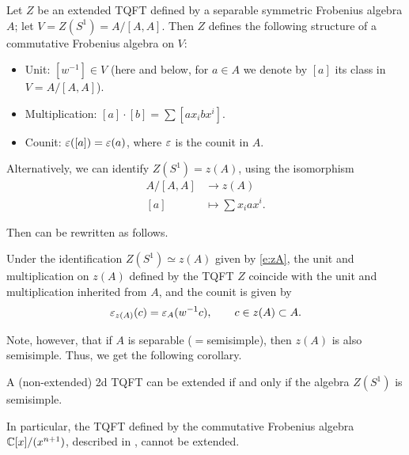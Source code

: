 \begin{theorem}\label{t:centerTQFT}
  Let $Z$ be an extended TQFT defined by a separable symmetric Frobenius algebra
  $A$; let $V=Z(S^1)=A/[A,A]$. Then $Z$ defines the following structure of
  a commutative Frobenius algebra on $V$:
  \begin{itemize}
    \item Unit: $[w^{-1}]\in V$ \textup{(}here and below, for $a\in A$ we denote by
        $[a]$ its class in $V=A/[A,A]$\textup{)}.
    \item Multiplication: $[a]\cdot [b]=\sum [ax_ibx^i]$.
    \item Counit: $\varepsilon([a])=\varepsilon (a)$, where $\varepsilon$ is the counit in $A$.
  \end{itemize}
\end{theorem}

Alternatively, we can identify $Z(S^1)=z(A)$, using the isomorphism
\begin{equation}\label{e:zA}
  \begin{aligned}
    A/[A,A]&\to z(A)\\
     [a]&\mapsto \sum x_iax^i.
   \end{aligned}
\end{equation}

Then  can be rewritten as follows.
\begin{theorem} \label{t:centerTQFT2}
  Under the identification $Z(S^1)\simeq z(A)$ given by \eqref{e:zA},
  the unit and multiplication on $z(A)$ defined by the TQFT $Z$ coincide with the unit and
  multiplication inherited from $A$, and the counit is given by
  $$
    \varepsilon_{z(A)} (c)=\varepsilon_A(w^{-1}c), \qquad c\in z(A)\subset A.
  $$
\end{theorem}


Note, however, that if $A$ is separable ($=$semisimple), then $z(A)$ is
also semisimple. Thus, we get the following corollary.
\begin{corollary}
  A \textup{(}non-extended\textup{)} 2d TQFT can be extended if and only if the algebra $Z(S^1)$
  is semisimple.
\end{corollary}
In particular, the TQFT defined by the commutative
Frobenius algebra $\mathbb{C}[x]/(x^{n+1})$, described in ,
cannot be extended.

